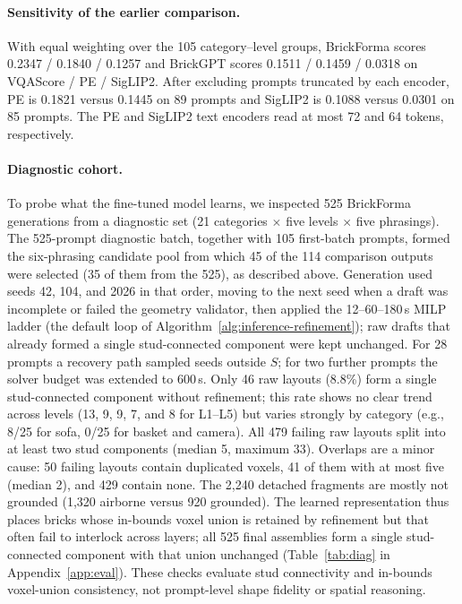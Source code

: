 \documentclass[letterpaper]{article} %
\begin{document}
\paragraph{Sensitivity of the earlier comparison.}
With equal weighting over the 105 category--level groups, BrickForma scores 0.2347 / 0.1840 / 0.1257 and BrickGPT scores 0.1511 / 0.1459 / 0.0318 on VQAScore / PE / SigLIP2. After excluding prompts truncated by each encoder, PE is 0.1821 versus 0.1445 on 89 prompts and SigLIP2 is 0.1088 versus 0.0301 on 85 prompts. The PE and SigLIP2 text encoders read at most 72 and 64 tokens, respectively.

\paragraph{Diagnostic cohort.}
To probe what the fine-tuned model learns, we inspected 525 BrickForma generations from a diagnostic set (21 categories $\times$ five levels $\times$ five phrasings). The 525-prompt diagnostic batch, together with 105 first-batch prompts, formed the six-phrasing candidate pool from which 45 of the 114 comparison outputs were selected (35 of them from the 525), as described above. Generation used seeds 42, 104, and 2026 in that order, moving to the next seed when a draft was incomplete or failed the geometry validator, then applied the 12--60--180\,s MILP ladder (the default loop of Algorithm~\ref{alg:inference-refinement}); raw drafts that already formed a single stud-connected component were kept unchanged. For 28 prompts a recovery path sampled seeds outside $S$; for two further prompts the solver budget was extended to 600\,s. Only 46 raw layouts (8.8\%) form a single stud-connected component without refinement; this rate shows no clear trend across levels (13, 9, 9, 7, and 8 for L1--L5) but varies strongly by category (e.g., 8/25 for sofa, 0/25 for basket and camera). All 479 failing raw layouts split into at least two stud components (median 5, maximum 33). Overlaps are a minor cause: 50 failing layouts contain duplicated voxels, 41 of them with at most five (median 2), and 429 contain none. The 2,240 detached fragments are mostly not grounded (1,320 airborne versus 920 grounded). The learned representation thus places bricks whose in-bounds voxel union is retained by refinement but that often fail to interlock across layers; all 525 final assemblies form a single stud-connected component with that union unchanged (Table~\ref{tab:diag} in Appendix~\ref{app:eval}). These checks evaluate stud connectivity and in-bounds voxel-union consistency, not prompt-level shape fidelity or spatial reasoning.
\end{document}
